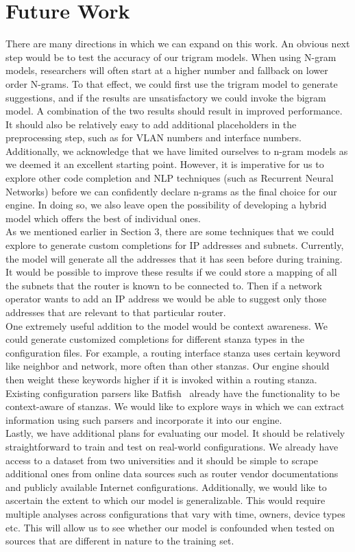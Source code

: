 \section{Future Work}
There are many directions in which we can expand on this work. An obvious next step would be to test the accuracy of our trigram models. When using N-gram models, researchers will often start at a higher number and fallback on lower order N-grams. To that effect, we could first use the trigram model to generate suggestions, and if the results are unsatisfactory we could invoke the bigram model. A combination of the two results should result in improved performance. It should also be relatively easy to add additional placeholders in the preprocessing step, such as for VLAN numbers and interface numbers. Additionally, we acknowledge that we have limited ourselves to n-gram models as we deemed it an excellent starting point. However, it is imperative for us to explore other code completion and NLP techniques (such as Recurrent Neural Networks) before we can confidently declare n-grams as the final choice for our engine. In doing so, we also leave open the possibility of developing a hybrid model which offers the best of individual ones.\\

As we mentioned earlier in Section 3, there are some techniques that we could explore to generate custom completions for IP addresses and subnets. Currently, the model will generate all the addresses that it has seen before during training. It would be possible to improve these results if we could store a mapping of all the subnets that the router is known to be connected to. Then if a network operator wants to add an IP address we would be able to suggest only those addresses that are relevant to that particular router.\\

One extremely useful addition to the model would be context awareness. We could generate customized completions for different stanza types in the configuration files. For example, a routing interface stanza uses certain keyword like neighbor and network, more often than other stanzas. Our engine should then weight these keywords higher if it is invoked within a routing stanza. Existing configuration parsers like Batfish~\cite{batfish} already have the functionality to be context-aware of stanzas. We would like to explore ways in which we can extract information using such parsers and incorporate it into our engine.\\ 

Lastly, we have additional plans for evaluating our model. It should be relatively straightforward to train and test on real-world configurations. We already have access to a dataset from two universities and it should be simple to scrape additional ones from online data sources such as router vendor documentations and publicly available Internet configurations. Additionally, we would like to ascertain the extent to which our model is generalizable. This would require multiple analyses across configurations that vary with time, owners, device types etc. This will allow us to see whether our model is confounded when tested on sources that are different in nature to the training set. 